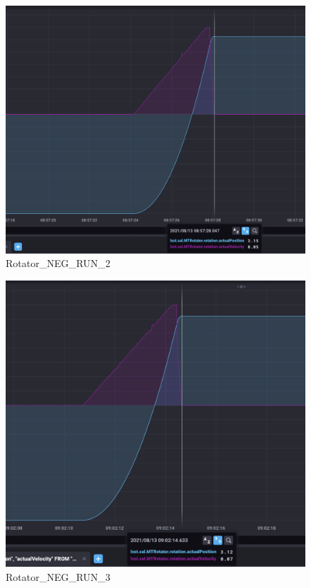 \documentclass[SE,lsstdraft,authoryear,toc]{lsstdoc}
\begin{document}
\begin{figure}
  \includegraphics[width=\linewidth]{media/rotator_neg_2.png}
  \caption{Rotator\_NEG\_RUN\_2}
  \label{fig:Rotator_NEG_RUN_2}
\end{figure}

\begin{figure}
  \includegraphics[width=\linewidth]{media/rotator_neg_3.png}
  \caption{Rotator\_NEG\_RUN\_3}
  \label{fig:Rotator_NEG_RUN_3}
\end{figure}
\end{document}
